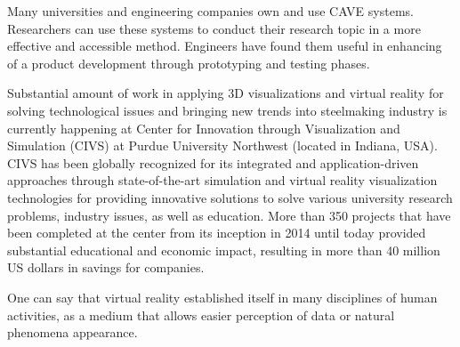 Many universities and engineering companies own and use CAVE systems. Researchers can use these systems to conduct their research topic in a more effective and accessible method. Engineers have found them useful in enhancing of a product development through prototyping and testing phases.

Substantial amount of work in applying 3D visualizations and virtual reality for solving technological issues and bringing new trends into steelmaking industry is currently happening at Center for Innovation through Visualization and Simulation (CIVS) at Purdue University Northwest (located in Indiana, USA). CIVS has been globally recognized for its integrated and application-driven approaches through state-of-the-art simulation and virtual reality visualization technologies for providing innovative solutions to solve various university research problems, industry issues, as well as education. More than 350 projects that have been completed at the center from its inception in 2014 until today provided substantial educational and economic impact, resulting in more than 40 million US dollars in savings for companies.

One can say that virtual reality established itself in many disciplines of human activities, as a medium that allows easier perception of data or natural phenomena appearance.


%
%
%

